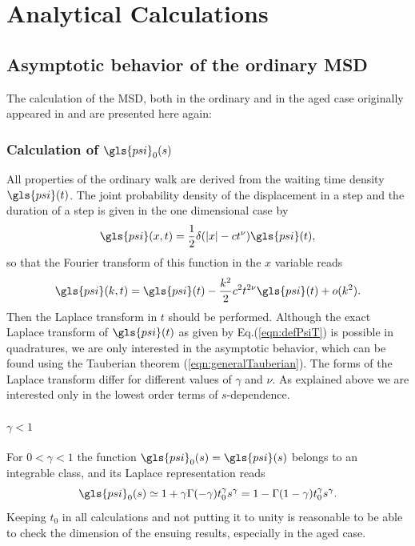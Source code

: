 \chapter{Analytical Calculations}

\section{Asymptotic behavior of the ordinary MSD}

The calculation of the MSD, both in the ordinary and in the aged case originally appeared in 
\cite{bothe} 
and are presented here again:

\subsection*{Calculation of $\gls{psi}_0(s)$}

All properties of the ordinary walk are derived from the waiting time density $\gls{psi}(t)$. The joint probability density of the displacement in a step and the duration of a step is given in the one dimensional case by
%
\begin{equation}
 \gls{psi}(x,t) = \frac{1}{2} \delta(|x| - ct^\nu ) \gls{psi}(t),
\end{equation}
%
so that the Fourier transform of this function in the $x$ variable reads
\begin{equation}
 \gls{psi}(k,t) = \gls{psi}(t) - \frac{k^2}{2} c^2 t^{2 \nu} \gls{psi}(t) + o(k^2). 
\end{equation}
%
Then the Laplace transform in $t$ should be performed.  Although the exact Laplace transform of $\gls{psi}(t)$ as given by Eq.(\ref{eqn:defPsiT}) is possible in quadratures, we are only interested in the asymptotic behavior, which can be found using the Tauberian theorem (\ref{eqn:generalTauberian}). The forms of the Laplace transform 
differ for different values of $\gamma$ and $\nu$. As explained above we are interested only in the lowest order terms of $s$-dependence. 

\subsubsection*{$ \gamma<1$}
For $0<\gamma <1$ the function $ \gls{psi}_0(s) = \gls{psi}(s)$ belongs to an integrable class, and its Laplace representation reads
\begin{equation}
 \gls{psi}_0(s) \simeq 1 + \gamma \Gamma(-\gamma) t_0^\gamma s^\gamma 
 = 1-\Gamma(1-\gamma) t_0^\gamma s^\gamma. \label{eqn:psi0GammaSmall}
\end{equation}
Keeping $t_0$ in all calculations and not putting it to unity is reasonable to be able to check the dimension of the ensuing results, especially in the aged case. 

